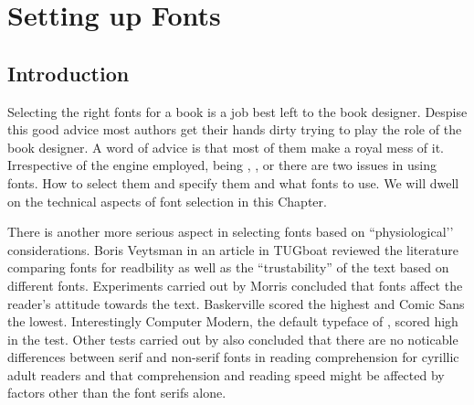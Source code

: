 \makeatletter\@specialtrue\makeatother

\newcommand{\mf}{{\fontencoding{U}\fontfamily{zmf}\selectfont METAFONT}}

\newcommand{\pcstrut}{\vrule height11pt width0pt}

\newcommand{\sample}{Typographia Ars Artium Omnium Conservatrix}

\newcommand{\thefont}[4][OT1]{%
	\textcolor{thefontname}{#2}&%
	\pcstrut\fontencoding{#1}\fontfamily{#3}\selectfont#4\\}

\newcommand{\fonttitle}[1]{%
	\multicolumn2{p{\columnwidth}}{\vrule height1.5pc width0pt
	\fontseries{b}\selectfont\textcolor{Subheadings}{#1}}\\[3pt]}

\newcommand{\normalencoding}{\fontencoding{OT1}}
\newcommand\ttverb[1]{\texttt{\string#1}}


\chapter{Setting up Fonts}
\label{ch:fonts}
\section{Introduction}
\pagestyle{headings}
\larger
Selecting the right fonts for a book is a job best left to the book designer. Despise this good advice most \latex authors get their hands dirty trying to play the role of the book designer. A word of advice is that most of them make a royal mess of it. Irrespective of the \tex engine employed, being \tex, \latexe, \lualatex or \xelatex there are two issues in using fonts. How to select them and specify them and what fonts to use. We will dwell on the technical aspects of font selection in this Chapter.

There is another more serious aspect in selecting fonts based on ``physiological’’ considerations. Boris Veytsman in an article in TUGboat \citep{boris2012} reviewed the literature comparing fonts for readbility as well as the ``trustability'' of the text based on different fonts. Experiments carried out by Morris \citep{morris2012a} concluded that fonts affect the reader's attitude towards the text. Baskerville scored the highest and Comic Sans the lowest.
Interestingly Computer Modern, the default typeface of \tex, scored high in the test.  Other tests carried out by \cite{boris2012a} also concluded that there are no noticable differences between serif and non-serif fonts in reading comprehension for cyrillic adult readers and that comprehension and reading speed might be affected by factors other than the font serifs alone. 

